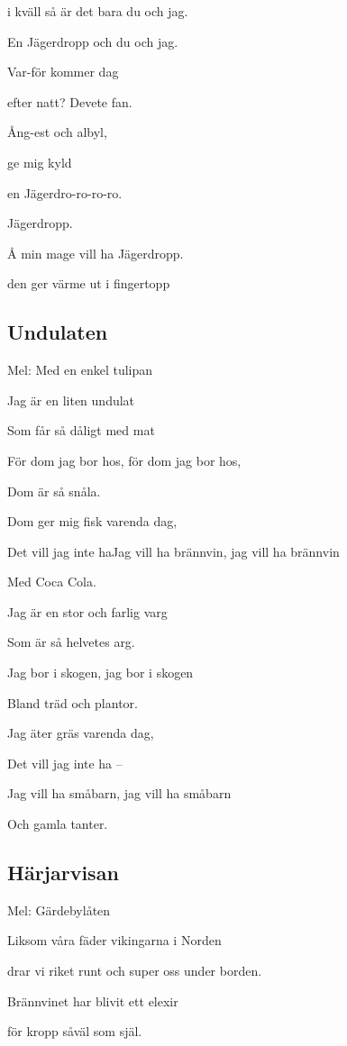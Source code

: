 i kväll så är det bara du och jag.

En Jägerdropp och du och jag.\bigskip

Var-för kommer dag

efter natt? Devete fan.

Ång-est och albyl,

ge mig kyld

en Jägerdro-ro-ro-ro.\bigskip

Jägerdropp.

Å min mage vill ha Jägerdropp.

den ger värme ut i fingertopp

\subsection{\textbf{Undulaten}}

Mel: Med en enkel tulipan \bigskip


Jag är en liten undulat

Som får så dåligt med mat

För dom jag bor hos, för dom jag bor hos,

Dom är så snåla.

Dom ger mig fisk varenda dag,

Det vill jag inte haJag vill ha brännvin, 
jag vill ha brännvin

Med Coca Cola.\bigskip

Jag är en stor och farlig varg

Som är så helvetes arg.

Jag bor i skogen, jag bor i skogen

Bland träd och plantor.

Jag äter gräs varenda dag,

Det vill jag inte ha –

Jag vill ha småbarn, jag vill ha småbarn

Och gamla tanter. \bigskip

\subsection{\textbf{Härjarvisan}}

Mel: Gärdebylåten \bigskip


Liksom våra fäder vikingarna i Norden

drar vi riket runt och super oss under 
borden.

Brännvinet har blivit ett elexir

för kropp såväl som själ.

